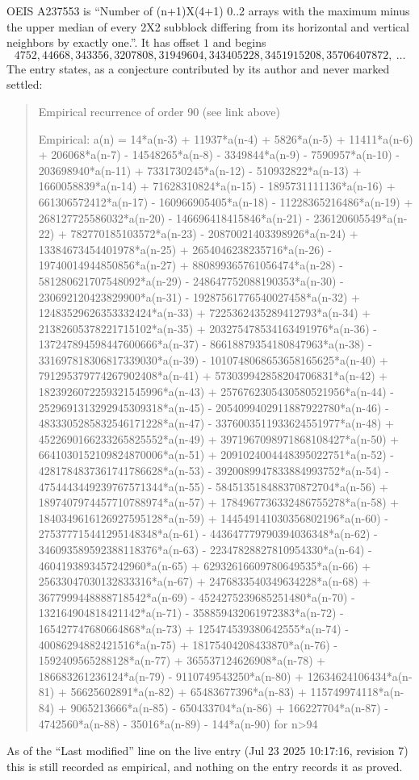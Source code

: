 \documentclass[11pt,a4paper]{article}
\theoremstyle{plain}
\theoremstyle{definition}
\begin{document}
OEIS A237553 is ``Number of (n+1)X(4+1) 0..2 arrays with the maximum minus the upper median of every 2X2 subblock differing from its horizontal and vertical neighbors by exactly one.''. It has offset $1$ and begins
\[
4752, 44668, 343356, 3207808, 31949604, 343405228, 3451915208, 35706407872,\ \dots
\]
The entry states, as a conjecture contributed by its author and never marked settled:
\begin{quote}
Empirical recurrence of order 90 (see link above)

Empirical: a(n) = 14*a(n-3) + 11937*a(n-4) + 5826*a(n-5) + 11411*a(n-6) + 206068*a(n-7) - 14548265*a(n-8) - 3349844*a(n-9) - 7590957*a(n-10) - 203698940*a(n-11) + 7331730245*a(n-12) - 510932822*a(n-13) + 1660058839*a(n-14) + 71628310824*a(n-15) - 1895731111136*a(n-16) + 661306572412*a(n-17) - 160966905405*a(n-18) - 11228365216486*a(n-19) + 268127725586032*a(n-20) - 146696418415846*a(n-21) - 236120605549*a(n-22) + 782770185103572*a(n-23) - 20870021403398926*a(n-24) + 13384673454401978*a(n-25) + 2654046238235716*a(n-26) - 19740014944850856*a(n-27) + 880899365761056474*a(n-28) - 581280621707548092*a(n-29) - 248647752088190353*a(n-30) - 230692120423829900*a(n-31) - 19287561776540027458*a(n-32) + 12483529626353332424*a(n-33) + 7225362435289412793*a(n-34) + 21382605378221715102*a(n-35) + 203275478534163491976*a(n-36) - 137247894598447600666*a(n-37) - 86618879354180847963*a(n-38) - 331697818306817339030*a(n-39) - 1010748068653658165625*a(n-40) + 791295379774267902408*a(n-41) + 573039942858204706831*a(n-42) + 1823926072259321545996*a(n-43) + 2576762305430580521956*a(n-44) - 2529691313292945309318*a(n-45) - 2054099402911887922780*a(n-46) - 4833305285832546171228*a(n-47) - 3376003511933624551977*a(n-48) + 4522690166233265825552*a(n-49) + 3971967098971868108427*a(n-50) + 6641030152109824870006*a(n-51) + 2091024004448395022751*a(n-52) - 4281784837361741786628*a(n-53) - 3920089947833884993752*a(n-54) - 4754443449239767571344*a(n-55) - 584513518488370872704*a(n-56) + 1897407974457710788974*a(n-57) + 1784967736332486755278*a(n-58) + 1840349616126927595128*a(n-59) + 144549141030356802196*a(n-60) - 275377715441295148348*a(n-61) - 443647779790394036348*a(n-62) - 346093589592388118376*a(n-63) - 22347828827810954330*a(n-64) - 4604193893457242960*a(n-65) + 62932616609780649535*a(n-66) + 25633047030132833316*a(n-67) + 2476833540349634228*a(n-68) + 3677999448888718542*a(n-69) - 4524275239685251480*a(n-70) - 132164904818421142*a(n-71) - 358859432061972383*a(n-72) - 165427747680664868*a(n-73) + 125474539380642555*a(n-74) - 40086294882421516*a(n-75) + 18175404208433870*a(n-76) - 1592409565288128*a(n-77) + 365537124626908*a(n-78) + 186683261236124*a(n-79) - 9110749543250*a(n-80) + 12634624106434*a(n-81) + 56625602891*a(n-82) + 65483677396*a(n-83) + 115749974118*a(n-84) + 9065213666*a(n-85) - 650433704*a(n-86) + 166227704*a(n-87) - 4742560*a(n-88) - 35016*a(n-89) - 144*a(n-90) for n>94
\end{quote}
As of the ``Last modified'' line on the live entry (Jul 23 2025 10:17:16, revision 7) this is still
recorded as empirical, and nothing on the entry records it as proved.
\end{document}
